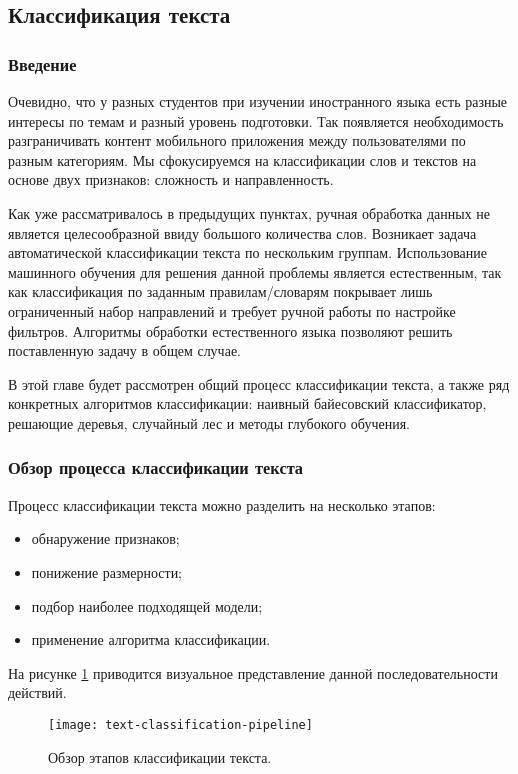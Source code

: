 \subsection{Классификация текста}

\subsubsection{Введение}
Очевидно, что у разных студентов при изучении иностранного языка есть разные интересы по темам и разный уровень подготовки. Так появляется необходимость разграничивать контент мобильного приложения между пользователями по разным категориям. Мы сфокусируемся на классификации слов и текстов на основе двух признаков: сложность и направленность. 

Как уже рассматривалось в предыдущих пунктах, ручная обработка данных не является целесообразной ввиду большого количества слов. Возникает задача автоматической классификации текста по нескольким группам. Использование машинного обучения для решения данной проблемы является естественным, так как классификация по заданным правилам/словарям покрывает лишь ограниченный набор направлений и требует ручной работы по настройке фильтров. Алгоритмы обработки естественного языка позволяют решить поставленную задачу в общем случае.

В этой главе будет рассмотрен общий процесс классификации текста, а также ряд конкретных алгоритмов классификации: наивный байесовский классификатор, решающие деревья, случайный лес и методы глубокого обучения.

\subsubsection{Обзор процесса классификации текста}
Процесс классификации текста можно разделить на несколько этапов:
\begin{itemize}
	\item обнаружение признаков;
	\item понижение размерности;
	\item подбор наиболее подходящей модели;
	\item применение алгоритма классификации.
\end{itemize}
На рисунке \ref{fig:text-classification-pipeline} приводится визуальное представление данной последовательности действий.
\begin{figure}[h]
	\centering
	\texttt{[image: text-classification-pipeline]}
	\caption{Обзор этапов классификации текста.}
	\label{fig:text-classification-pipeline}
\end{figure}

